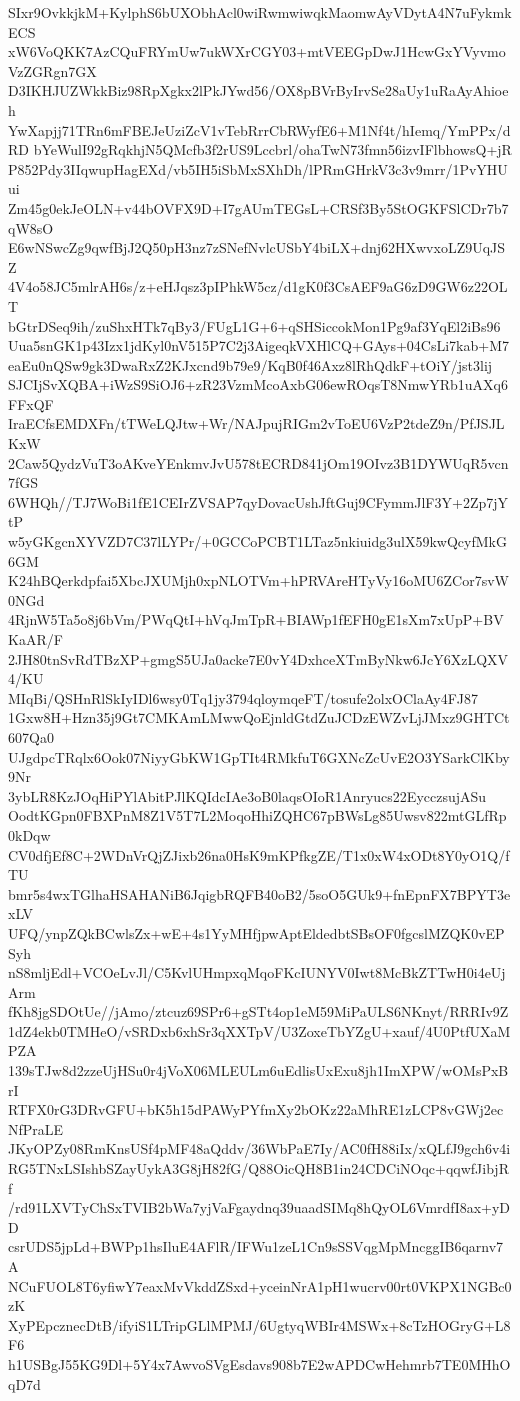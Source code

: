 SIxr9OvkkjkM+KylphS6bUXObhAcl0wiRwmwiwqkMaomwAyVDytA4N7uFykmkECS
xW6VoQKK7AzCQuFRYmUw7ukWXrCGY03+mtVEEGpDwJ1HcwGxYVyvmoVzZGRgn7GX
D3IKHJUZWkkBiz98RpXgkx2lPkJYwd56/OX8pBVrByIrvSe28aUy1uRaAyAhioeh
YwXapjj71TRn6mFBEJeUziZcV1vTebRrrCbRWyfE6+M1Nf4t/hIemq/YmPPx/dRD
bYeWulI92gRqkhjN5QMcfb3f2rUS9Lccbrl/ohaTwN73fmn56izvIFlbhowsQ+jR
P852Pdy3IIqwupHagEXd/vb5IH5iSbMxSXhDh/lPRmGHrkV3c3v9mrr/1PvYHUui
Zm45g0ekJeOLN+v44bOVFX9D+I7gAUmTEGsL+CRSf3By5StOGKFSlCDr7b7qW8sO
E6wNSwcZg9qwfBjJ2Q50pH3nz7zSNefNvlcUSbY4biLX+dnj62HXwvxoLZ9UqJSZ
4V4o58JC5mlrAH6s/z+eHJqsz3pIPhkW5cz/d1gK0f3CsAEF9aG6zD9GW6z22OLT
bGtrDSeq9ih/zuShxHTk7qBy3/FUgL1G+6+qSHSiccokMon1Pg9af3YqEl2iBs96
Uua5snGK1p43Izx1jdKyl0nV515P7C2j3AigeqkVXHlCQ+GAys+04CsLi7kab+M7
eaEu0nQSw9gk3DwaRxZ2KJxcnd9b79e9/KqB0f46Axz8lRhQdkF+tOiY/jst3lij
SJCIjSvXQBA+iWzS9SiOJ6+zR23VzmMcoAxbG06ewROqsT8NmwYRb1uAXq6FFxQF
IraECfsEMDXFn/tTWeLQJtw+Wr/NAJpujRIGm2vToEU6VzP2tdeZ9n/PfJSJLKxW
2Caw5QydzVuT3oAKveYEnkmvJvU578tECRD841jOm19OIvz3B1DYWUqR5vcn7fGS
6WHQh//TJ7WoBi1fE1CEIrZVSAP7qyDovacUshJftGuj9CFymmJlF3Y+2Zp7jYtP
w5yGKgcnXYVZD7C37lLYPr/+0GCCoPCBT1LTaz5nkiuidg3ulX59kwQcyfMkG6GM
K24hBQerkdpfai5XbcJXUMjh0xpNLOTVm+hPRVAreHTyVy16oMU6ZCor7svW0NGd
4RjnW5Ta5o8j6bVm/PWqQtI+hVqJmTpR+BIAWp1fEFH0gE1sXm7xUpP+BVKaAR/F
2JH80tnSvRdTBzXP+gmgS5UJa0acke7E0vY4DxhceXTmByNkw6JcY6XzLQXV4/KU
MIqBi/QSHnRlSkIyIDl6wsy0Tq1jy3794qloymqeFT/tosufe2olxOClaAy4FJ87
1Gxw8H+Hzn35j9Gt7CMKAmLMwwQoEjnldGtdZuJCDzEWZvLjJMxz9GHTCt607Qa0
UJgdpcTRqlx6Ook07NiyyGbKW1GpTIt4RMkfuT6GXNcZcUvE2O3YSarkClKby9Nr
3ybLR8KzJOqHiPYlAbitPJlKQIdcIAe3oB0laqsOIoR1Anryucs22EycczsujASu
OodtKGpn0FBXPnM8Z1V5T7L2MoqoHhiZQHC67pBWsLg85Uwsv822mtGLfRp0kDqw
CV0dfjEf8C+2WDnVrQjZJixb26na0HsK9mKPfkgZE/T1x0xW4xODt8Y0yO1Q/fTU
bmr5s4wxTGlhaHSAHANiB6JqigbRQFB40oB2/5soO5GUk9+fnEpnFX7BPYT3exLV
UFQ/ynpZQkBCwlsZx+wE+4s1YyMHfjpwAptEldedbtSBsOF0fgcslMZQK0vEPSyh
nS8mljEdl+VCOeLvJl/C5KvlUHmpxqMqoFKcIUNYV0Iwt8McBkZTTwH0i4eUjArm
fKh8jgSDOtUe//jAmo/ztcuz69SPr6+gSTt4op1eM59MiPaULS6NKnyt/RRRIv9Z
1dZ4ekb0TMHeO/vSRDxb6xhSr3qXXTpV/U3ZoxeTbYZgU+xauf/4U0PtfUXaMPZA
139sTJw8d2zzeUjHSu0r4jVoX06MLEULm6uEdlisUxExu8jh1ImXPW/wOMsPxBrI
RTFX0rG3DRvGFU+bK5h15dPAWyPYfmXy2bOKz22aMhRE1zLCP8vGWj2ecNfPraLE
JKyOPZy08RmKnsUSf4pMF48aQddv/36WbPaE7Iy/AC0fH88iIx/xQLfJ9gch6v4i
RG5TNxLSIshbSZayUykA3G8jH82fG/Q88OicQH8B1in24CDCiNOqc+qqwfJibjRf
/rd91LXVTyChSxTVIB2bWa7yjVaFgaydnq39uaadSIMq8hQyOL6VmrdfI8ax+yDD
csrUDS5jpLd+BWPp1hsIluE4AFlR/IFWu1zeL1Cn9sSSVqgMpMncggIB6qarnv7A
NCuFUOL8T6yfiwY7eaxMvVkddZSxd+yceinNrA1pH1wucrv00rt0VKPX1NGBc0zK
XyPEpcznecDtB/ifyiS1LTripGLlMPMJ/6UgtyqWBIr4MSWx+8cTzHOGryG+L8F6
h1USBgJ55KG9Dl+5Y4x7AwvoSVgEsdavs908b7E2wAPDCwHehmrb7TE0MHhOqD7d
